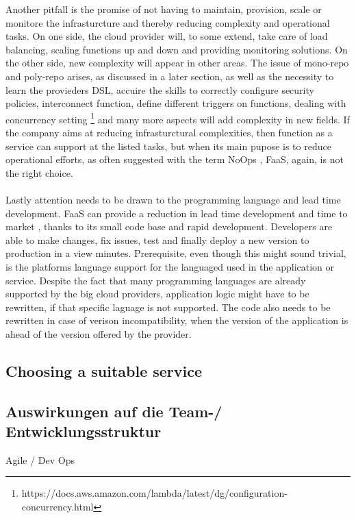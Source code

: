 \documentclass[11pt]{article}
\begin{document}
Another pitfall is the promise of not having to maintain, provision, scale or monitore the infrasturcture and thereby reducing complexity and operational tasks. On one side, the cloud provider will, to some extend, take care of load balancing, scaling functions up and down and providing monitoring solutions. On the other side, new complexity will appear in other areas. The issue of mono-repo and poly-repo arises, as discussed in a later section, as well as the necessity to learn the provieders DSL, accuire the skills to correctly configure security policies, interconnect function, define different triggers on functions, dealing with concurrency setting \footnote{https://docs.aws.amazon.com/lambda/latest/dg/configuration-concurrency.html} and many more aspects will add complexity in new fields. If the company aims at reducing infrasturctural complexities, then function as a service can support at the listed tasks, but when its main pupose is to reduce operational efforts, as often suggested with the term \glqq NoOps\grqq{} \cite{eivy2017wary}, FaaS, again, is not the right choice.\\\\
Lastly attention needs to be drawn to the programming language and lead time development. FaaS can provide a reduction in lead time development and time to market \cite{sewak2018winning} \cite{leitner2019mixed}, thanks to its small code base and rapid development. Developers are able to make changes, fix issues, test and finally deploy a new version to production in a view minutes. Prerequisite, even though this might sound trivial, is the platforms language support for the languaged used in the application or service. Despite the fact that many programming languages are already supported by the big cloud providers, application logic might have to be rewritten, if that specific laguage is not supported. The code also needs to be rewritten in case of verison incompatibility, when the version of the application is ahead of the version offered by the provider. 
\subsection{Choosing a suitable service}

\subsection{Auswirkungen auf die Team-/ Entwicklungsstruktur}
Agile  / Dev Ops
\end{document}
